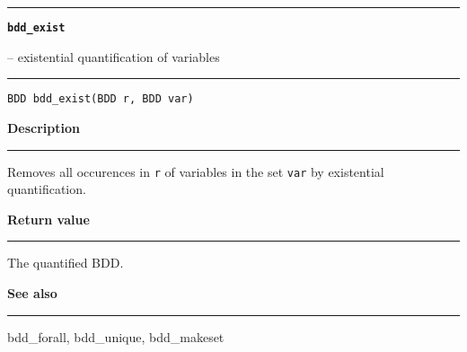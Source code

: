 \begin{minipage}{\textwidth}

\noindent\begin{minipage}{\textwidth}
\rule{\textwidth}{0.5mm}
{\tt\bf bdd\_exist }
\--- existential quantification of variables  \hspace{\fill}
\\\rule[1.5ex]{\textwidth}{0.5mm}
\end{minipage}

\noindent\begin{verbatim}
BDD bdd_exist(BDD r, BDD var) 
\end{verbatim}

\vspace{\parsep}\noindent
{\bf Description}\\\rule[1.5ex]{\textwidth}{0.2mm}\vspace{-1.5ex}\setlength{\parindent}{1em}
Removes all occurences in {\tt r} of variables in the set
           {\tt var} by existential quantification. 

\setlength{\parindent}{0em}\vspace{\parsep}\vspace{\baselineskip}\noindent
{\bf Return value}\\\rule[1.5ex]{\textwidth}{0.2mm}\vspace{-1.5ex}
The quantified BDD. 

\vspace{\parsep}\vspace{\baselineskip}\noindent
{\bf See also}\\\rule[1.5ex]{\textwidth}{0.2mm}\vspace{-1.5ex}
bdd\_forall, bdd\_unique, bdd\_makeset 
\end{minipage}
\vspace{8ex}
